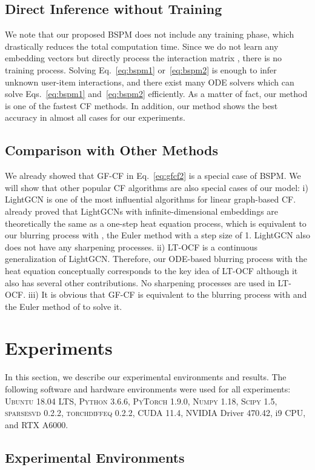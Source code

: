 \documentclass[sigconf,natbib=true]{acmart}
\begin{document}
\subsection{Direct Inference without Training}
We note that our proposed BSPM does not include any training phase, which drastically reduces the total computation time. Since we do not learn any embedding vectors but directly process the interaction matrix , there is no training process. Solving Eq.~\eqref{eq:bspm1} or~\eqref{eq:bspm2} is enough to infer unknown user-item interactions, and there exist many ODE solvers which can solve Eqs.~\eqref{eq:bspm1} and~\eqref{eq:bspm2} efficiently. As a matter of fact, our method is one of the fastest CF methods. In addition, our method shows the best accuracy in almost all cases for our experiments.

\subsection{Comparison with Other Methods}
We already showed that GF-CF in Eq.~\eqref{eq:gfcf2} is a special case of BSPM. We will show that other popular CF algorithms are also special cases of our model: i) LightGCN is one of the most influential algorithms for linear graph-based CF. \citet{Shen21GFCF} already proved that LightGCNs with infinite-dimensional embeddings are theoretically the same as a one-step heat equation process, which is equivalent to our blurring process with , the Euler method with a step size of 1. LightGCN also does not have any sharpening processes. ii) LT-OCF is a continuous generalization of LightGCN. Therefore, our ODE-based blurring process with the heat equation conceptually corresponds to the key idea of LT-OCF although it also has several other contributions. No sharpening processes are used in LT-OCF. iii) It is obvious that GF-CF is equivalent to the blurring process with  and the Euler method of  to solve it.


\section{Experiments}
In this section, we describe our experimental environments and results. The following software and hardware environments were used for all experiments: \textsc{Ubuntu} 18.04 LTS, \textsc{Python} 3.6.6, \textsc{PyTorch} 1.9.0, \textsc{Numpy} 1.18, \textsc{Scipy} 1.5, \textsc{sparsesvd} 0.2.2, \textsc{torchdiffeq} 0.2.2, \textsc{CUDA} 11.4, \textsc{NVIDIA} Driver 470.42, i9 CPU, and \textsc{RTX A6000}.
\subsection{Experimental Environments}
\end{document}
